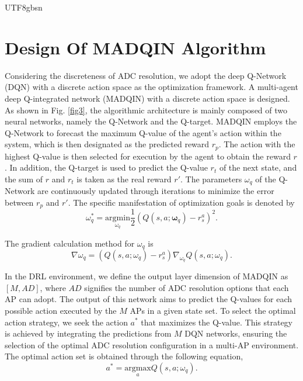 \documentclass[lettersize,journal]{IEEEtran}
\begin{document}
\begin{CJK}{UTF8}{gbsn}
\section{Design Of MADQIN Algorithm}
Considering the discreteness of ADC resolution, we adopt the deep Q-Network (DQN) with a discrete action space as the optimization framework. A multi-agent deep Q-integrated network (MADQIN) with a discrete action space is designed. As shown in Fig. \ref{fig3}, the algorithmic architecture is mainly composed of two neural networks, namely the Q-Network and the Q-target. MADQIN employs the Q-Network to forecast the maximum Q-value of the agent's action within the system, which is then designated as the predicted reward $r_p$. The action with the highest Q-value is then selected for execution by the agent to obtain the reward $r$. In addition, the Q-target is used to predict the Q-value $r_t$ of the next state, and the sum of $r$ and $r_t$ is taken as the real reward $r'$. The parameters $\omega_q$ of the Q-Network are continuously updated through iterations to minimize the error between $r_p$ and $r'$. The specific manifestation of optimization goals is denoted by
\begin{equation}\omega  _q^* = \underset{\omega  _q}{\text{argmin}} \frac{1}{2} (Q(s ,a ;\mathbf{\omega  } _q)-r_s^a)^2.\end{equation}

The gradient calculation method for $\omega _q$ is
\begin{equation}\nabla \omega _q = (Q(s,a;\omega _q)-r_s^a)\nabla _{\omega _q}Q(s,a;\omega _q).\end{equation}

In the DRL environment, we define the output layer dimension of MADQIN as $[M, AD]$, where $AD$ signifies the number of ADC resolution options that each AP can adopt. The output of this network aims to predict the Q-values for each possible action executed by the $M$ APs in a given state set. To select the optimal action strategy, we seek the action $a^*$ that maximizes the Q-value. This strategy is achieved by integrating the predictions from $M$ DQN networks, ensuring the selection of the optimal ADC resolution configuration in a multi-AP environment. The optimal action set is obtained through the following equation,
\begin{equation}\label{eqn-39}a^* = \underset{a}{\text{argmax}}Q(s,a;\omega  _q).\end{equation}


\end{CJK}
\end{document}
